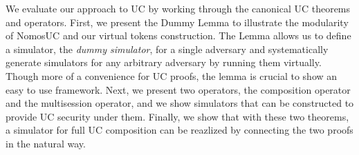 We evaluate our approach to UC by working through the canonical UC theorems and operators.
First, we present the Dummy Lemma to illustrate the modularity of NomosUC and our virtual tokens construction.
The Lemma allows us to define a simulator, the \emph{dummy simulator}, for a single adversary and systematically generate simulators for any arbitrary adversary
by running them virtually. Though more of a convenience for UC proofs, the lemma is crucial to show an easy to use framework.
Next, we present two operators, the composition operator and the multisession operator, and we show simulators that can be constructed to provide UC security under them.
Finally, we show that with these two theorems, a simulator for full UC composition can be reazlized by connecting the two proofs in the natural way.

